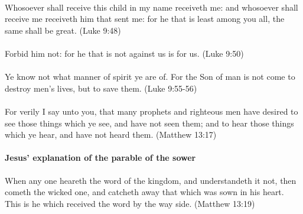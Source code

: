 \paragraph{} Whosoever shall receive this child in my name receiveth me: and whosoever shall receive me receiveth him that sent me: for he that is least among you all, the same shall be great. (Luke 9:48)

\paragraph{} Forbid him not: for he that is not against us is for us. (Luke 9:50)

\paragraph{} Ye know not what manner of spirit ye are of. For the Son of man is not come to destroy men's lives, but to save them. (Luke 9:55-56)

\paragraph{} For verily I say unto you, that many prophets and righteous men have desired to see those things which ye see, and have not seen them; and to hear those things which ye hear, and have not heard them. (Matthew 13:17)


\paragraph{Jesus' explanation of the parable of the sower} 

When any one heareth the word of the kingdom, and understandeth it not, then cometh the wicked one, and catcheth away that which was sown in his heart. This is he which received the word by the way side. (Matthew 13:19)



